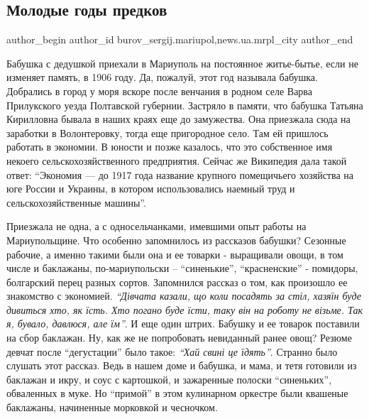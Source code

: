  
 
 
 
 
 
\subsection{Молодые годы предков}
\label{sec:13_07_2019.stz.news.ua.mrpl_city.1.molodye_gody_predkov}
 
\ifcmt
 author_begin
   author_id burov_sergij.mariupol,news.ua.mrpl_city
 author_end
\fi


Бабушка с дедушкой приехали в Мариуполь на постоянное житье-бытье, если не
изменяет память, в 1906 году. Да, пожалуй, этот год называла бабушка. Добрались
в город у моря  вскоре после венчания в родном селе Варва Прилукского уезда
Полтавской губернии. Застряло в памяти, что бабушка Татьяна Кирилловна бывала в
наших краях еще до замужества. Она приезжала сюда на заработки в Волонтеровку,
тогда еще пригородное село. Там ей пришлось работать в экономии. В юности и
позже казалось, что это собственное имя некоего сельскохозяйственного
предприятия. Сейчас же Википедия дала такой ответ: \enquote{Экономия — до 1917 года
название крупного помещичьего хозяйства на юге России и Украины, в котором
использовались наемный труд и сельскохозяйственные машины}.


Приезжала не одна, а с односельчанками, имевшими опыт работы на Мариупольщине.
Что особенно запомнилось из рассказов бабушки? Сезонные рабочие, а именно
такими были она и ее товарки - выращивали овощи, в том числе и баклажаны,
по-мариупольски – \enquote{синенькие}, \enquote{красненские} - помидоры, болгарский перец
разных сортов. Запомнился рассказ о том, как произошло ее знакомство с
экономией. \emph{\enquote{Дівчата казали, що коли посадять за стіл, хазяїн буде дивиться хто,
як їсть. Хто погано буде їсти, таку він на роботу не візьме. Так я, бувало,
давлюся, але їм}}. И еще один штрих. Бабушку и ее товарок поставили на сбор
баклажан. Ну, как же не попробовать невиданный ранее овощ? Резюме девчат после
\enquote{дегустации} было такое: \emph{\enquote{Хай свині це їдять}}. Странно было слушать этот
рассказ. Ведь в нашем доме и бабушка, и мама, и тетя готовили из баклажан и
икру, и соус с картошкой, и зажаренные полоски  \enquote{синеньких}, обваленных  в
муке. Но \enquote{примой} в этом кулинарном оркестре были квашеные баклажаны,
начиненные морковкой и чесночком.

